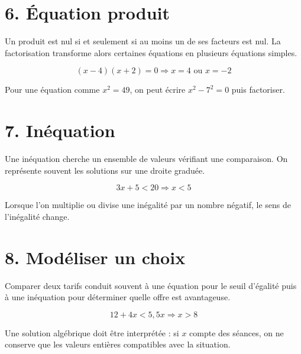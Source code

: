 
\section{6. Équation produit}
Un produit est nul si et seulement si au moins un de ses facteurs est nul. La factorisation transforme alors certaines équations en plusieurs équations simples.

\[
(x-4)(x+2)=0\Rightarrow x=4\text{ ou }x=-2
\]

\begin{exemple}
Pour une équation comme $x^2=49$, on peut écrire $x^2-7^2=0$ puis factoriser.
\end{exemple}

\section{7. Inéquation}
Une inéquation cherche un ensemble de valeurs vérifiant une comparaison. On représente souvent les solutions sur une droite graduée.

\[
3x+5<20\Rightarrow x<5
\]

\begin{exemple}
Lorsque l’on multiplie ou divise une inégalité par un nombre négatif, le sens de l’inégalité change.
\end{exemple}

\section{8. Modéliser un choix}
Comparer deux tarifs conduit souvent à une équation pour le seuil d’égalité puis à une inéquation pour déterminer quelle offre est avantageuse.

\[
12+4x<5{,}5x\Rightarrow x>8
\]

\begin{exemple}
Une solution algébrique doit être interprétée : si $x$ compte des séances, on ne conserve que les valeurs entières compatibles avec la situation.
\end{exemple}

